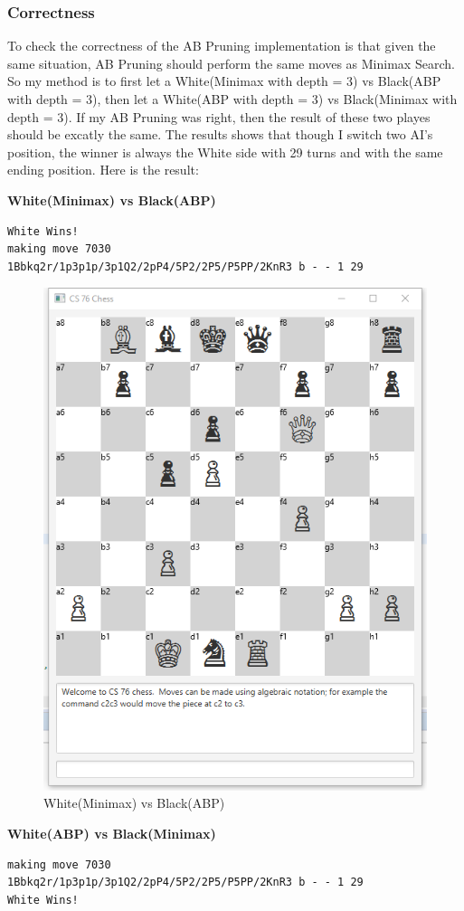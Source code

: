 \documentclass{article}
\begin{document}
\subsubsection{Correctness}
To check the correctness of the AB Pruning implementation is that given the same situation, AB Pruning should perform the same moves as Minimax Search. So my method is to first let a White(Minimax with depth = 3) vs Black(ABP with depth = 3), then let a White(ABP with depth = 3) vs Black(Minimax with depth = 3). If my AB Pruning was right, then the result of these two playes should be excatly the same. The results shows that though I switch two AI's position, the winner is always the White side with 29 turns and with the same ending position. Here is the result:

\clearpage
\textbf{White(Minimax) vs Black(ABP)}
\begin{lstlisting}
White Wins!
making move 7030
1Bbkq2r/1p3p1p/3p1Q2/2pP4/5P2/2P5/P5PP/2KnR3 b - - 1 29
\end{lstlisting}

\begin{figure}[H]
\centering
\includegraphics[width=0.7\linewidth]{W_MINI_B_ABP}
\caption{White(Minimax) vs Black(ABP)}
\end{figure}

\clearpage
\textbf{White(ABP) vs Black(Minimax)}
\begin{lstlisting}
making move 7030
1Bbkq2r/1p3p1p/3p1Q2/2pP4/5P2/2P5/P5PP/2KnR3 b - - 1 29
White Wins!
\end{lstlisting}
\end{document}
